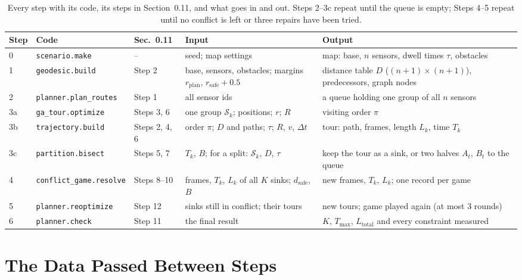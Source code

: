 \documentclass[10pt]{article}
\newcommand{\code}[1]{\texttt{#1}}
\newcommand{\rplan}{r_{\mathrm{plan}}}
\newcommand{\rsafe}{r_{\mathrm{safe}}}
\newcommand{\dsafe}{d_{\mathrm{safe}}}
\begin{document}
\begin{table}[H]
\centering\small
\renewcommand{\arraystretch}{1.25}
\begin{tabularx}{\textwidth}{@{}l>{\raggedright\arraybackslash}p{3.55cm}>{\raggedright\arraybackslash}p{1.25cm}LL@{}}
\toprule
Step & Code & Sec.~0.11 & Input & Output \\
 & \code{scenario.make} & -- & seed; map settings & map: base, $n$ sensors, dwell times $\tau$, obstacles \\
1 & \code{geodesic.build} & Step 2 & base, sensors, obstacles; margins $\rplan$, $\rsafe+0.5$ &
  distance table $D$ ($(n{+}1)\times(n{+}1)$), predecessors, graph nodes \\
2 & \code{planner.plan\_routes} & Step 1 & all sensor ids & a queue holding one group of all $n$ sensors \\
3a & \code{ga\_tour.optimize} & Steps 3, 6 & one group $\mathcal{S}_k$; positions; $r$; $R$ & visiting order $\pi$ \\
3b & \code{trajectory.build} & Steps 2, 4, 6 & order $\pi$; $D$ and paths; $\tau$; $R$, $v$, $\Delta t$ &
  tour: path, frames, length $L_k$, time $T_k$ \\
3c & \code{partition.bisect} & Steps 5, 7 & $T_k$, $B$; for a split: $\mathcal{S}_k$, $D$, $\tau$ &
  keep the tour as a sink, or two halves $A_t$, $B_t$ to the queue \\
4 & \code{conflict\_game.resolve} & Steps 8--10 & frames, $T_k$, $L_k$ of all $K$ sinks; $\dsafe$, $B$ &
  new frames, $T_k$, $L_k$; one record per game \\
5 & \code{planner.reoptimize} & Step 12 & sinks still in conflict; their tours & new tours; game played again
  (at most 3 rounds) \\
6 & \code{planner.check} & Step 11 & the final result & $K$, $T_{\max}$, $L_{\mathrm{total}}$ and every constraint
  measured \\
\bottomrule
\end{tabularx}
\caption{Every step with its code, its steps in Section~0.11, and what goes in and out. Steps 2--3c repeat until the
queue is empty; Steps 4--5 repeat until no conflict is left or three repairs have been tried.}
\label{tab:glance}
\end{table}

\section{The Data Passed Between Steps}
\end{document}
